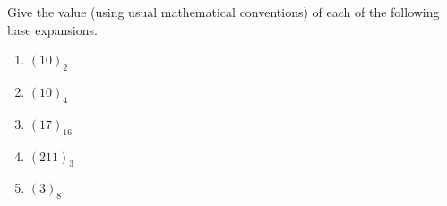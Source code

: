 
Give the value (using usual mathematical conventions) of 
each of the following base expansions.
\begin{enumerate}
    \item $(10)_{2}$
    \item $(10)_{4}$
    \item $(17)_{16}$
    \item $(211)_{3}$
    \item $(3)_{8}$
\end{enumerate}